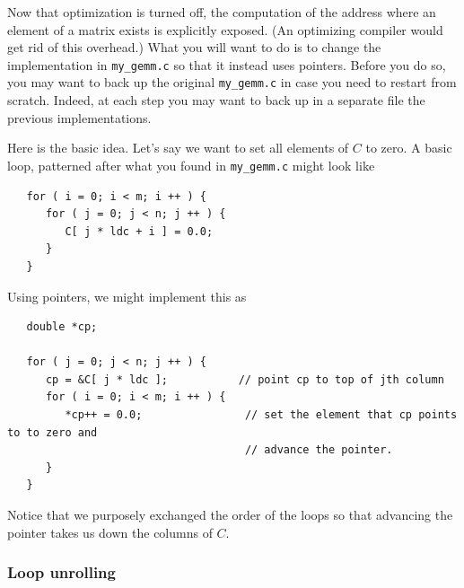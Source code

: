 Now that optimization is turned off, the computation of the address where an element of a matrix exists is explicitly exposed.  (An optimizing compiler would get rid of this overhead.)
What you will want to do is to change the implementation in {\tt my\_gemm.c} so that it instead uses pointers.
Before you do so, you may want to back up the original {\tt my\_gemm.c} in case you need to restart from scratch.  Indeed, at each step you may want to back up in a separate file the previous implementations.

Here is the basic idea.  Let's say we want to set 
all elements of $C $ to zero.  A basic loop, patterned after what you found in {\tt my\_gemm.c} might look like
\begin{verbatim}
   for ( i = 0; i < m; i ++ ) {                   
      for ( j = 0; j < n; j ++ ) {                
         C[ j * ldc + i ] = 0.0;
      }                                           
   }                                              
\end{verbatim}
Using pointers, we might implement this as
\begin{verbatim}
   double *cp;

   for ( j = 0; j < n; j ++ ) {
      cp = &C[ j * ldc ];           // point cp to top of jth column               
      for ( i = 0; i < m; i ++ ) {                
         *cp++ = 0.0;                // set the element that cp points to to zero and 
                                     // advance the pointer.
      }                                           
   }                                              
\end{verbatim}
Notice that we purposely exchanged the order of the loops so that advancing the pointer takes us down the columns of $ C $.

\subsubsection{Loop unrolling}

